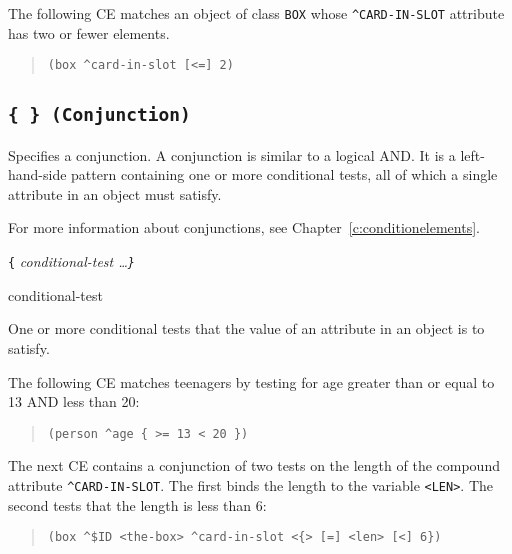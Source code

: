 \Example

The following CE matches an object of class \verb|BOX| whose
\verb|^CARD-IN-SLOT| attribute has two or fewer elements.

\begin{quote}
\begin{verbatim}
(box ^card-in-slot [<=] 2)
\end{verbatim}
\end{quote}

\subsection{\tt\{ \tt\} (Conjunction)}

Specifies a conjunction. A conjunction is similar to a logical AND. It
is a left-hand-side pattern containing one or more conditional tests,
all of which a single attribute in an object must satisfy.

For more information about conjunctions, see
Chapter~\ref{c:conditionelements}.

\Format

\verb|{| \it{conditional-test} \ldots\verb|}|

\begin{operands}
\item[conditional-test]

  One or more conditional tests that the value of an attribute in an
  object is to satisfy.
\end{operands}

\Example

The following CE matches teenagers by testing for age greater than or
equal to 13 AND less than 20:

\begin{quote}
\begin{verbatim}
(person ^age { >= 13 < 20 })
\end{verbatim}
\end{quote}

The next CE contains a conjunction of two tests on the length of the
compound attribute \verb|^CARD-IN-SLOT|. The first binds the length to
the variable \verb|<LEN>|. The second tests that the length is less
than 6:

\begin{quote}
\begin{verbatim}
(box ^$ID <the-box> ^card-in-slot <{> [=] <len> [<] 6})
\end{verbatim}
\end{quote}

